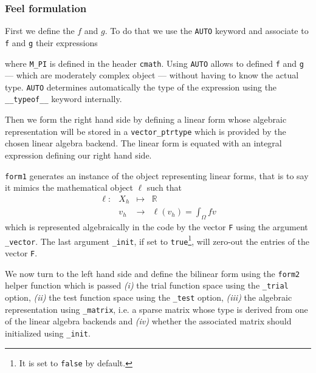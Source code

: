 \subsubsection{Feel formulation}
\label{sec:feel-formulation-1}

First we define the $f$ and $g$. To do that we use the
\lstinline!AUTO! keyword and associate to \lstinline!f! and
\lstinline!g! their expressions



\noindent where \lstinline!M_PI! is defined in the header
\lstinline!cmath!.  Using \lstinline!AUTO! allows to defined
\lstinline!f!  and \lstinline!g! --- which are moderately complex
object --- without having to know the actual type. \lstinline!AUTO!
determines automatically the type of the expression using the
\lstinline!__typeof__! keyword internally.

Then we form the right hand side by defining a linear form whose
algebraic representation will be stored in a
\lstinline!vector_ptrtype! which is provided by the chosen linear
algebra backend. The linear form is equated with an integral
expression defining our right hand side.



\noindent \lstinline!form1! generates an instance of the object
representing linear forms, that is to say it mimics the mathematical
object $\ell$ such that
\begin{equation}
  \label{eq:9}
  \begin{array}{rccl}
    \ell: & X_h & \mapsto & \mathbb{R}\\
    & v_h & \rightarrow &\ell(v_h)=\int_\Omega f v
  \end{array}
\end{equation}
which is represented algebraically in the code by the vector
\lstinline!F! using the argument \lstinline!_vector!. The last
argument \lstinline!_init!, if set to \lstinline!true!\footnote{It is
  set to \lstinline!false! by default.}, will zero-out the entries of
the vector \lstinline!F!.


We now turn to the left hand side and define the bilinear form using
the \lstinline!form2! helper function which is passed \textit{(i)} the
trial function space using the \lstinline!_trial! option,
\textit{(ii)} the test function space using the \lstinline!_test!
option, \textit{(iii)} the algebraic representation using
\lstinline!_matrix!, i.e. a sparse matrix whose type is derived from
one of the linear algebra backends and \textit{(iv)} whether the
associated matrix should initialized using
\lstinline!_init!.


